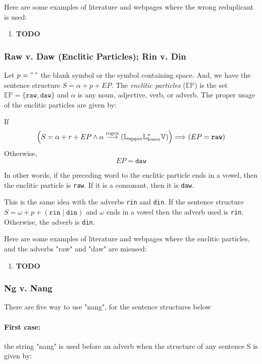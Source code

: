 \begin{example}
      Here are some examples of literature and webpages where the wrong reduplicant is
      used:
\end{example}
\begin{enumerate}
      \item \textbf{TODO}
\end{enumerate}

\subsubsection{Raw v. Daw (Enclitic Particles); Rin v. Din}

Let \(p = "\,"\) the blank symbol or the symbol containing space. And, we have the
sentence structure \(S = \alpha + p + EP\). The \textit{enclitic particles}
(\(\mathbb{EP}\)) is the set \(\mathbb{EP} = \{\texttt{raw}, \texttt{daw}\}\) and
\(\alpha\) is any noun, adjective, verb, or adverb. The proper usage of the enclitic
particles are given by:

If
\[
    \left( S = \alpha + r + EP \land \alpha \overset{\text{regex}}{\longrightarrow} (\mathbb{L}_\text{upper}\mathbb{L}_\text{lower}^*\mathbb{V}) \right)
    \Longrightarrow 
    \left( EP = \texttt{raw} \right)
\]
Otherwise,
\[
      EP = \texttt{daw}
\]

In other words, if the preceding word to the enclitic particle ends in a vowel,
then the enclitic particle is \texttt{raw}. If it is a consonant, then it is \texttt{daw}.

This is the same idea with the adverbs \texttt{rin} and \texttt{din}. If the sentence structure
\(S = \omega + p + (\texttt{rin}\mid\texttt{din})\) and \(\omega\) ends in a vowel
then the adverb used is \texttt{rin}. Otherwise, the adverb is \texttt{din}.

Here are some examples of literature and webpages where the enclitic particles,
and the adverbs "raw" and "daw" are misused:
\begin{enumerate}
      \item \textbf{TODO}
\end{enumerate}

\subsubsection{Ng v. Nang}

There are five way to use "nang", for the sentence structures below

\paragraph{First case:} the string "nang" is used before an adverb when the
structure of any sentence S is given by:

